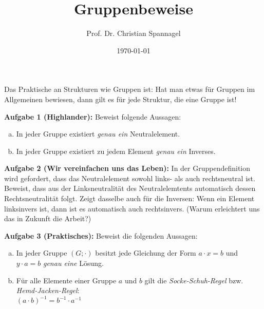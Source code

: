 \documentclass{../cssheet}
\title{Gruppenbeweise}
\author{Prof. Dr. Christian Spannagel}
\date{\today}
\begin{document}
\printtitle

Das Praktische an Strukturen wie Gruppen ist: Hat man etwas für Gruppen im Allgemeinen bewiesen, dann gilt es für jede Struktur, die eine Gruppe ist!

\textbf{Aufgabe 1 (Highlander):}  Beweist folgende Aussagen:
\begin{enumerate}[a)]
\item In jeder Gruppe existiert \emph{genau ein} Neutralelement.
\item In jeder Gruppe existiert zu jedem Element \emph{genau ein} Inverses.
\end{enumerate}

\textbf{Aufgabe 2 (Wir vereinfachen uns das Leben):}  In der Gruppendefinition wird gefordert, dass das Neutralelement sowohl links- als auch rechtsneutral ist. Beweist, dass aus der Linksneutralität des Neutralelemtents automatisch dessen Rechtsneutralität folgt. Zeigt dasselbe auch für die Inversen: Wenn ein Element linksinvers ist, dann ist es automatisch auch rechtsinvers. (Warum erleichtert uns das in Zukunft die Arbeit?)

\textbf{Aufgabe 3 (Praktisches):}  Beweist die folgenden Aussagen:
\begin{enumerate}[a)]

\item In jeder Gruppe $(G; \cdot)$ besitzt jede Gleichung der Form $a \cdot x = b$ und $y \cdot a = b$ \emph{genau eine} Lösung.
\item Für alle Elemente einer Gruppe $a$ und $b$ gilt die \emph{Socke-Schuh-Regel} bzw. \emph{Hemd-Jacken-Regel}:\\ $(a \cdot b)^{-1}=b^{-1}\cdot a^{-1}$
\end{enumerate}

\vspace*{2cm}
\printlicense

\printsocials
\end{document}
